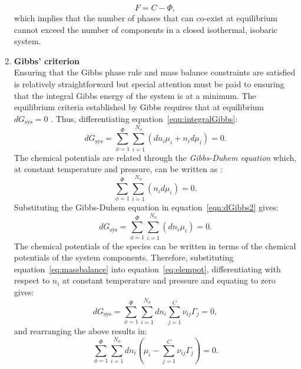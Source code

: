 \begin{enumerate}
			\begin{equation}
                			F=C-\Phi,
            		\end{equation}
			which implies that the number of phases that can co-exist at equilibrium cannot exceed the number of components in a closed isothermal, isobaric system.			
		\item \textbf{Gibbs' criterion}\\
			Ensuring that the Gibbs phase rule and mass balance constraints are satisfied is relatively straightforward but special attention must be paid to ensuring that the integral Gibbs energy of the system is at a minimum. The equilibrium criteria established by Gibbs requires that at equilibrium $d G_\text{sys} = 0$ \cite{Gibbs:1878aa}. Thus, differentiating equation~\eqref{eqn:integralGibbs}:
			\begin{equation}\label{eqn:dGibbs1}
				d G_{\text{sys}} = \sum_{\phi=1}^{\Phi} \sum_{i=1}^{N_{\phi}} \left( d n_{i}\mu_{i} + n_{i} d \mu_{i}\right) = 0.
			\end{equation}
			The chemical potentials are related through the \emph{Gibbs-Duhem equation} which, at constant temperature and pressure, can be written as \cite{Olander08}:
			\begin{equation}\label{eqn:dGibbs2}
				\sum_{\phi=1}^{\Phi} \sum_{i=1}^{N_{\phi}} \left( n_{i} d \mu_{i}\right) = 0.
			\end{equation}
			Substituting the Gibbs-Duhem equation in equation~\eqref{eqn:dGibbs2} gives:
			\begin{equation}\label{eqn:dGibbs3}
				d G_{\text{sys}} = \sum_{\phi=1}^{\Phi} \sum_{i=1}^{N_{\phi}} \left( d n_{i}\mu_{i} \right) = 0.
			\end{equation}
			The chemical potentials of the species can be written in terms of the chemical potentials of the system components. Therefore, substituting equation~\eqref{eq:massbalance} into equation~\eqref{eq:elempot}, differentiating with respect to $n_{i}$ at constant temperature and pressure and equating to zero gives:
			\begin{equation}\label{eqn:dGibbs4}
				d G_{\text{sys}} = \sum_{\phi=1}^{\Phi} \sum_{i=1}^{N_{\phi}}  d n_{i}\sum_{j=1}^{C}\nu_{ij}\Gamma_j  = 0,
			\end{equation}
			and rearranging the above results in:
			\begin{equation}\label{eqn:dGibbs5}
				\sum_{\phi=1}^{\Phi} \sum_{i=1}^{N_{\phi}}  d n_{i} \left( \mu_{i} - \sum_{j=1}^{C}\nu_{ij}\Gamma_j \right) = 0.
			\end{equation}

\end{enumerate}
